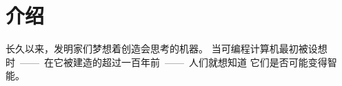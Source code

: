
\chapter{介绍}
\label{ch:intro}

长久以来，发明家们梦想着创造会思考的机器。
当可编程计算机最初被设想时~——~在它被建造的超过一百年前~——~人们就想知道
它们是否可能变得智能\citep{Lovelace1842}。
